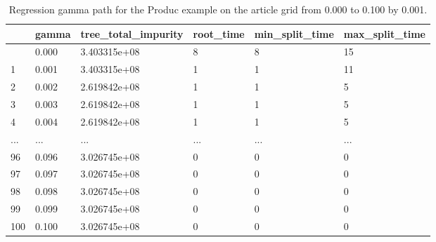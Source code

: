 \documentclass[
  letterpaper,
  DIV=11,
  numbers=noendperiod]{scrartcl}
\begin{document}
\begin{longtable}[]{@{}llllll@{}}

\caption{\label{tbl-produc-gamma-search}Regression gamma path for the
Produc example on the article grid from 0.000 to 0.100 by 0.001.}

\tabularnewline

\toprule\noalign{}
& gamma & tree\_total\_impurity & root\_time & min\_split\_time &
max\_split\_time \\
\midrule\noalign{}
\endhead
\bottomrule\noalign{}
\endlastfoot
0 & 0.000 & 3.403315e+08 & 8 & 8 & 15 \\
1 & 0.001 & 3.403315e+08 & 1 & 1 & 11 \\
2 & 0.002 & 2.619842e+08 & 1 & 1 & 5 \\
3 & 0.003 & 2.619842e+08 & 1 & 1 & 5 \\
4 & 0.004 & 2.619842e+08 & 1 & 1 & 5 \\
... & ... & ... & ... & ... & ... \\
96 & 0.096 & 3.026745e+08 & 0 & 0 & 0 \\
97 & 0.097 & 3.026745e+08 & 0 & 0 & 0 \\
98 & 0.098 & 3.026745e+08 & 0 & 0 & 0 \\
99 & 0.099 & 3.026745e+08 & 0 & 0 & 0 \\
100 & 0.100 & 3.026745e+08 & 0 & 0 & 0 \\

\end{longtable}
\end{document}
